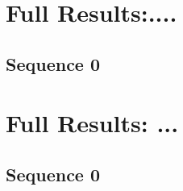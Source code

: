 \begin{appendices}
\newpage
{}   

\chapter{Full Results:....}
\label{chapter:appendix_experimental_results_1}
\setcounter{table}{0}
\renewcommand{\thetable}{A.\arabic{table}}
\setcounter{figure}{0}
\renewcommand{\thefigure}{A.\arabic{figure}}

\newpage
\section*{Sequence 0}






\chapter{Full Results: ...}
\label{chapter:appendix_experimental_results_2}
\setcounter{table}{0}
\renewcommand{\thetable}{B.\arabic{table}}
\setcounter{figure}{0}
\renewcommand{\thefigure}{B.\arabic{figure}}
 
 
 
\newpage 
\section*{Sequence 0} 


 

\end{appendices}